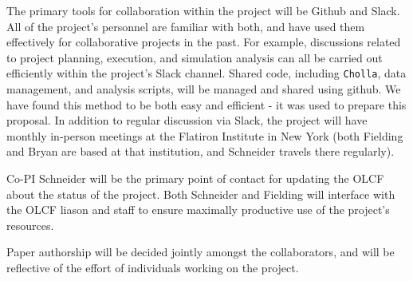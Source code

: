 \documentclass[11pt,letterpaper,english]{article}
\begin{document}
\begin{flushleft}
The primary tools for collaboration within the project will be Github and Slack. All of the project's personnel are familiar with both, and have used them effectively for collaborative projects in the past. For example, discussions related to project planning, execution, and simulation analysis can all be carried out efficiently within the project's Slack channel. Shared code, including {\tt Cholla}, data management, and analysis scripts, will be managed and shared using github. We have found this method to be both easy and efficient - it was used to prepare this proposal. In addition to regular discussion via Slack, the project will have monthly in-person meetings at the Flatiron Institute in New York (both Fielding and Bryan are based at that institution, and Schneider travels there regularly).

Co-PI Schneider will be the primary point of contact for updating the OLCF about the status of the project. Both Schneider and Fielding will interface with the OLCF liason and staff to ensure maximally productive use of the project's resources.

Paper authorship will be decided jointly amongst the collaborators, and will be reflective of the effort of individuals working on the project.


\end{flushleft}
\end{document}

